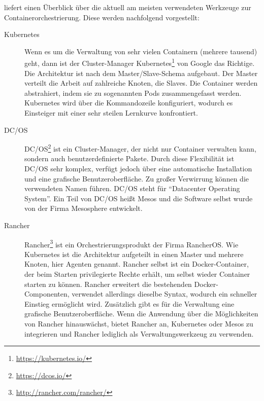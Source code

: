 \autocite{ix-orchestrierung-2017} liefert einen Überblick über die aktuell am meisten verwendeten Werkzeuge zur Containerorchestrierung. Diese werden nachfolgend vorgestellt:
\begin{description}
    \item [Kubernetes] Wenn es um die Verwaltung von sehr vielen Containern (mehrere tausend) geht, dann ist der Cluster-Manager Kubernetes\footnote{\url{https://kubernetes.io/}} von Google das Richtige.
    Die Architektur ist nach dem Master/Slave-Schema aufgebaut. Der Master verteilt die Arbeit auf zahlreiche Knoten, die Slaves.
    Die Container werden abstrahiert, indem sie zu sogenannten Pods zusammengefasst werden.
    Kubernetes wird über die Kommandozeile konfiguriert, wodurch es Einsteiger mit einer sehr steilen Lernkurve konfrontiert.
    \item [DC/OS] DC/OS\footnote{\url{https://dcos.io/}} ist ein Cluster-Manager, der nicht nur Container verwalten kann, sondern auch benutzerdefinierte Pakete.
    Durch diese Flexibilität ist DC/OS sehr komplex, verfügt jedoch über eine automatische Installation und eine grafische Benutzeroberfläche.
    Zu großer Verwirrung können die verwendeten Namen führen. DC/OS steht für "`Datacenter Operating System"'.
    Ein Teil von DC/OS heißt Mesos und die Software selbst wurde von der Firma Mesosphere entwickelt.
    \item [Rancher] Rancher\footnote{\url{http://rancher.com/rancher/}} ist ein Orchestrierungsprodukt der Firma RancherOS.
    Wie Kubernetes ist die Architektur aufgeteilt in einen Master und mehrere Knoten, hier Agenten genannt.
    Rancher selbst ist ein Docker-Container, der beim Starten privilegierte Rechte erhält, um selbst wieder Container starten zu können.
    Rancher erweitert die bestehenden Docker-Componenten, verwendet allerdings dieselbe Syntax, wodurch ein schneller Einstieg ermöglicht wird.
    Zusätzlich gibt es für die Verwaltung eine grafische Benutzeroberfläche. Wenn die Anwendung über die Möglichkeiten von Rancher hinauswächst, bietet Rancher an, Kubernetes oder Mesos zu integrieren und Rancher lediglich als Verwaltungswerkzeug zu verwenden.
\end{description}
